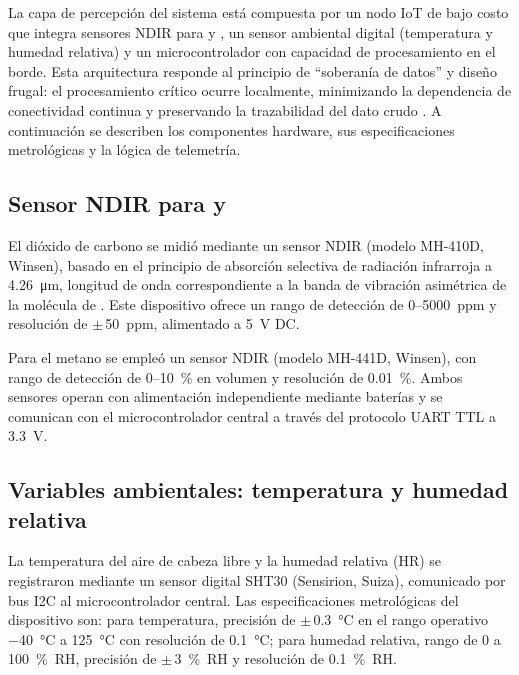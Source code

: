 
La capa de percepción del sistema está compuesta por un nodo IoT de bajo costo que integra sensores NDIR para  y , un sensor ambiental digital (temperatura y humedad relativa) y un microcontrolador con capacidad de procesamiento en el borde. Esta arquitectura responde al principio de ``soberanía de datos'' y diseño frugal: el procesamiento crítico ocurre localmente, minimizando la dependencia de conectividad continua y preservando la trazabilidad del dato crudo \parencite{vanIntegrationInternetofThingsSustainable2022a, duobieneDevelopmentWirelessSensor2022}. A continuación se describen los componentes hardware, sus especificaciones metrológicas y la lógica de telemetría.

\subsection{Sensor NDIR para \texorpdfstring{}{CO2} y \texorpdfstring{}{CH4}}
\label{subsec:cap2_sensor_ndir}

El dióxido de carbono se midió mediante un sensor NDIR (modelo MH-410D, Winsen), basado en el principio de absorción selectiva de radiación infrarroja a \SI{4.26}{\micro\metre}, longitud de onda correspondiente a la banda de vibración asimétrica de la molécula de . Este dispositivo ofrece un rango de detección de \num{0}--\num{5000}~ppm y resolución de $\pm$\,\SI{50}{ppm}, alimentado a \SI{5}{\volt} DC.

Para el metano se empleó un sensor NDIR (modelo MH-441D, Winsen), con rango de detección de \num{0}--\SI{10}{\percent} en volumen y resolución de \SI{0.01}{\percent}. Ambos sensores operan con alimentación independiente mediante baterías y se comunican con el microcontrolador central a través del protocolo UART TTL a \SI{3.3}{\volt}.

\subsection{Variables ambientales: temperatura y humedad relativa}
\label{subsec:cap2_sensor_ambiental}

La temperatura del aire de cabeza libre y la humedad relativa (HR) se registraron mediante un sensor digital SHT30 (Sensirion, Suiza), comunicado por bus I2C al microcontrolador central. Las especificaciones metrológicas del dispositivo son: para temperatura, precisión de $\pm$\,\SI{0.3}{\celsius} en el rango operativo \SI{-40}{\celsius} a \SI{125}{\celsius} con resolución de \SI{0.1}{\celsius}; para humedad relativa, rango de \num{0} a \SI{100}{\percent}~RH, precisión de $\pm$\,\SI{3}{\percent}~RH y resolución de \SI{0.1}{\percent}~RH.

